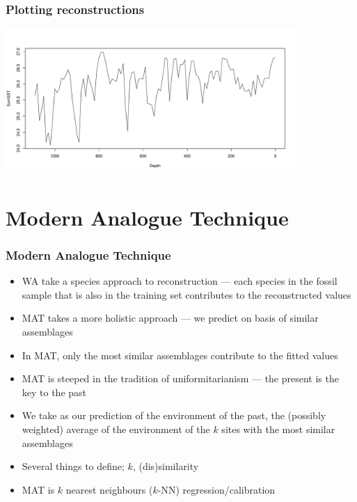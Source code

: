 \documentclass{beamer}
\begin{document}
\begin{frame}[fragile]
    \frametitle{Plotting reconstructions}
    \scriptsize
\begin{Schunk}
\begin{Sinput}
[0;34mr$>[0m reconPlot(pred, use.labels = TRUE, ylab = "SumSST", xlab = "Depth")
\end{Sinput}
\end{Schunk}
    \normalsize
    \begin{center}
    \includegraphics[width=11cm]{reconPlot}
    \end{center}
\end{frame}

\section{Modern Analogue Technique}

\begin{frame}
    \frametitle{Modern Analogue Technique}
    \begin{itemize}
        \item WA take a species approach to reconstruction --- each species in the fossil sample that is also in the training set contributes to the reconstructed values
        \item MAT takes a more holistic approach --- we predict on basis of similar assemblages
        \item In MAT, only the most similar assemblages contribute to the fitted values
        \item MAT is steeped in the tradition of \alert{uniformitarianism} --- \alert{the present is the key to the past}
        \item We take as our prediction of the environment of the past, the (possibly weighted) average of the environment of the $k$ sites with the most similar assemblages
        \item Several things to define; $k$, (dis)similarity
        \item MAT is $k$ nearest neighbours ($k$-NN) regression/calibration
    \end{itemize}
\end{frame}
\end{document}
